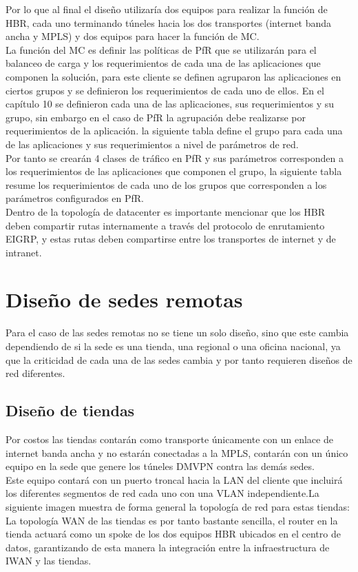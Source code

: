 Por lo que al final el diseño utilizaría dos equipos para realizar la función de HBR, cada uno terminando túneles hacia los dos transportes (internet banda ancha y MPLS) y dos equipos para hacer la función de MC.
\\
La función del MC es definir las políticas de PfR que se utilizarán para el balanceo de carga y los requerimientos de cada una de las aplicaciones que componen la solución, para este cliente se definen agruparon las aplicaciones en ciertos grupos y se definieron los requerimientos de cada uno de ellos. En el capítulo 10 se definieron cada una de las aplicaciones, sus requerimientos y su grupo, sin embargo en el caso de PfR la agrupación debe realizarse por requerimientos de la aplicación. la siguiente tabla define el grupo para cada una de las aplicaciones y sus requerimientos a nivel de parámetros de red.
\\
Por tanto se crearán 4 clases de tráfico en PfR y sus parámetros corresponden a los requerimientos de las aplicaciones que componen el grupo, la siguiente tabla resume los requerimientos de cada uno de los grupos que corresponden a los parámetros configurados en PfR.
\\
Dentro de la topología de datacenter es importante mencionar que los HBR deben compartir rutas internamente a través del protocolo de enrutamiento EIGRP, y estas rutas deben compartirse entre los transportes de internet y de intranet.

\section{Diseño de sedes remotas}
\label{sec:Diseño de sedes remotas}

Para el caso de las sedes remotas no se tiene un solo diseño, sino que este cambia dependiendo de si la sede es una tienda, una regional o una oficina nacional, ya que la criticidad de cada una de las sedes cambia y por tanto requieren diseños de red diferentes.


\subsection{Diseño de tiendas}
\label{sec:Diseño de tiendas}


Por costos las tiendas contarán como transporte únicamente con un enlace de internet banda ancha y no estarán conectadas a la MPLS, contarán con un único equipo en la sede que genere los túneles DMVPN contra las demás sedes.
\\
Este equipo contará con un puerto troncal hacia la LAN del cliente que incluirá los diferentes segmentos de red cada uno con una VLAN independiente.La siguiente imagen muestra de forma general la topología de red para estas tiendas:
\\
La topología WAN de las tiendas es por tanto bastante sencilla, el router en la tienda actuará como un spoke de los dos equipos HBR ubicados en el centro de datos, garantizando de esta manera la integración entre la infraestructura de IWAN y las tiendas.

